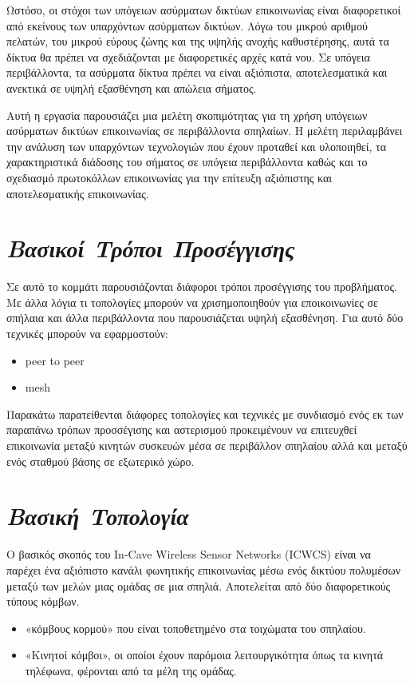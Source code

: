 \documentclass[12pt]{article}
\begin{document}
\begin{multicols}{2}
    Ωστόσο, οι στόχοι των υπόγειων ασύρματων δικτύων επικοινωνίας είναι
    διαφορετικοί από εκείνους των υπαρχόντων ασύρματων δικτύων.
    Λόγω του μικρού αριθμού πελατών, του μικρού εύρους ζώνης και της
    υψηλής ανοχής καθυστέρησης, 
    αυτά τα δίκτυα θα πρέπει να σχεδιάζονται με διαφορετικές αρχές κατά νου. 
    Σε υπόγεια περιβάλλοντα, τα ασύρματα δίκτυα πρέπει να είναι αξιόπιστα, αποτελεσματικά και ανεκτικά σε υψηλή εξασθένηση και απώλεια σήματος.
    
    Αυτή η εργασία παρουσιάζει μια μελέτη σκοπιμότητας για τη χρήση υπόγειων ασύρματων δικτύων επικοινωνίας σε περιβάλλοντα σπηλαίων. Η μελέτη περιλαμβάνει την ανάλυση των υπαρχόντων τεχνολογιών που έχουν προταθεί και υλοποιηθεί, τα χαρακτηριστικά διάδοσης του σήματος σε υπόγεια περιβάλλοντα καθώς και το σχεδιασμό πρωτοκόλλων επικοινωνίας για την επίτευξη αξιόπιστης και αποτελεσματικής επικοινωνίας.
    
    \section{\textit{\normalsize Βασικοί Τρόποι Προσέγγισης}}
    Σε αυτό το κομμάτι παρουσιάζονται διάφοροι τρόποι προσέγγισης του προβλήματος. Με άλλα λόγια τι τοπολογίες μπορούν να χρισημοποιηθούν για εποικοινωνίες σε σπήλαια και άλλα περιβάλλοντα που παρουσιάζεται υψηλή εξασθένηση.
    Για αυτό δύο τεχνικές μπορούν να εφαρμοστούν:
    \begin{itemize}
        \item peer to peer
        \item mesh
    \end{itemize}

    Παρακάτω παρατείθενται διάφορες τοπολογίες και τεχνικές με συνδιασμό ενός εκ των παραπάνω τρόπων προσσέγισης και αστερισμού προκειμένουν να επιτευχθεί επικοινωνία μεταξύ κινητών συσκευών μέσα σε περιβάλλον σπηλαίου αλλά και μεταξύ ενός σταθμού βάσης σε εξωτερικό χώρο.

    \section{\textit{\normalsize Βασική Τοπολογία}}
    Ο βασικός σκοπός του In-Cave Wireless Sensor Networks (ICWCS) είναι να παρέχει ένα αξιόπιστο κανάλι φωνητικής επικοινωνίας μέσω ενός δικτύου πολυμέσων μεταξύ των μελών
    μιας ομάδας σε μια σπηλιά. Αποτελείται από δύο διαφορετικούς τύπους κόμβων. 
    \begin{itemize}
        \item «κόμβους κορμού» που είναι τοποθετημένο στα τοιχώματα του σπηλαίου.
        \item «Κινητοί κόμβοι», οι οποίοι έχουν παρόμοια λειτουργικότητα όπως τα κινητά τηλέφωνα, φέρονται από τα μέλη της ομάδας.
    \end{itemize}


\end{multicols}
\end{document}
